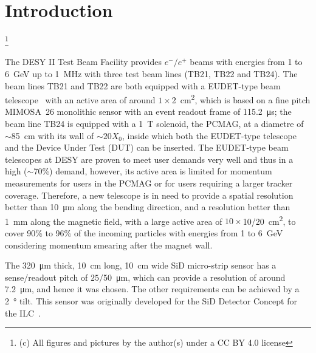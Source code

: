 \documentclass[conference]{IEEEtran}
\newcommand\blfootnote[1]{%
  \begingroup
  \renewcommand\thefootnote{}\footnote{#1}%
  \addtocounter{footnote}{-1}%
  \endgroup
}
\begin{document}
\section{Introduction}
\blfootnote{(c) All figures and pictures by the author(s) under a CC BY 4.0 license}
The DESY II Test Beam Facility\cite{desytbf}
provides $e^-/e^+$ beams with energies from 1 to \SI{6}{\GeV} up to \SI{1}{\MHz}
with three test beam lines (TB21, TB22 and TB24).
The beam lines TB21 and TB22 are both equipped with a EUDET-type beam telescope~\cite{eudet}
with an active area of around $1\times$\SI{2}{\square\centi\metre},
which is based on a fine pitch \uppercase{mimosa}~26 monolithic sensor with an event readout frame of \SI{115.2}{\micro\second};
the beam line TB24 is equipped with a \SI{1}{\tesla} solenoid, the PCMAG, at a diametre of $\sim$\SI{85}{\centi\metre} with its wall of $\sim20X_0$,
inside which both the EUDET-type telescope and the Device Under Test (DUT) can be inserted.
The EUDET-type beam telescopes at DESY are proven to meet user demands very well and thus in a high ($\sim$70\%) demand,
however, its active area is limited for momentum measurements for users in the PCMAG or for users requiring a larger tracker coverage.
Therefore, a new telescope is in need to provide a spatial resolution better than \SI{10}{\micro\metre} along the bending direction,
and a resolution better than \SI{1}{\milli\metre} along the magnetic field,
with a large active area of $10\times$10/\SI{20}{\square\centi\metre},
to cover 90\% to 96\% of the incoming particles with energies from 1 to \SI{6}{\GeV} considering momentum smearing after the magnet wall.

The \SI{320}{\micro\metre} thick, \SI{10}{cm} long, \SI{10}{cm} wide SiD micro-strip sensor has a sense/readout pitch of $25/$\SI{50}{\micro\metre},
which can provide a resolution of around \SI{7.2}{\micro\metre}, and hence it was chosen.
The other requirements can be achieved by a \SI{2}{\degree} tilt.
This sensor was originally developed for the SiD Detector Concept for the ILC~\cite{Behnke:2013lya}.
\end{document}
